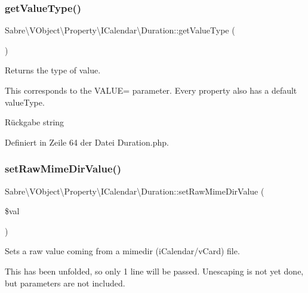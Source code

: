 \subsubsection{\texorpdfstring{get\+Value\+Type()}{getValueType()}}
{\footnotesize\ttfamily Sabre\textbackslash{}\+V\+Object\textbackslash{}\+Property\textbackslash{}\+I\+Calendar\textbackslash{}\+Duration\+::get\+Value\+Type (\begin{DoxyParamCaption}{ }\end{DoxyParamCaption})}

Returns the type of value.

This corresponds to the V\+A\+L\+UE= parameter. Every property also has a \textquotesingle{}default\textquotesingle{} value\+Type.

\begin{DoxyReturn}{Rückgabe}
string 
\end{DoxyReturn}


Definiert in Zeile 64 der Datei Duration.\+php.

\mbox{\label{class_sabre_1_1_v_object_1_1_property_1_1_i_calendar_1_1_duration_afc316b01ce159a154b46ebb954a91eaf}} 
\subsubsection{\texorpdfstring{set\+Raw\+Mime\+Dir\+Value()}{setRawMimeDirValue()}}
{\footnotesize\ttfamily Sabre\textbackslash{}\+V\+Object\textbackslash{}\+Property\textbackslash{}\+I\+Calendar\textbackslash{}\+Duration\+::set\+Raw\+Mime\+Dir\+Value (\begin{DoxyParamCaption}\item[{}]{\$val }\end{DoxyParamCaption})}

Sets a raw value coming from a mimedir (i\+Calendar/v\+Card) file.

This has been \textquotesingle{}unfolded\textquotesingle{}, so only 1 line will be passed. Unescaping is not yet done, but parameters are not included.


